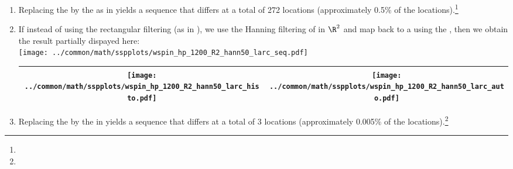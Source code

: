 \begin{example}
\begin{enumerate}
  \item \label{item:wspin_hp_rect50_R2_euclid}
        Replacing the  by the  as in 
        yields a sequence that differs at a total of 272 locations 
        (approximately 0.5\% of the locations).\footnote{} %

  \item \label{item:wspin_hp_hann50_R2_larc}
        If instead of using the rectangular filtering (as in ),
        we use the Hanning filtering of 
        in $\R^2$ and map back to a  using the ,
        then we obtain the result partially dispayed here:
        \\\texttt{[image: ../common/math/sspplots/wspin\_hp\_1200\_R2\_hann50\_larc\_seq.pdf]}
        \\\begin{tabular}{|>{\scs}c|>{\scs}c|}
             \hline
             \texttt{[image: ../common/math/sspplots/wspin\_hp\_1200\_R2\_hann50\_larc\_histo.pdf]}
            &\texttt{[image: ../common/math/sspplots/wspin\_hp\_1200\_R2\_hann50\_larc\_auto.pdf]}
           \\\hline
        \end{tabular}

  \item \label{item:wspin_hp_hann50_R2_euclid}
        Replacing the  by the  in 
        yields a sequence that differs at a total of 3 locations 
        (approximately 0.005\% of the locations).\footnote{} %
\end{enumerate}
\end{example}



